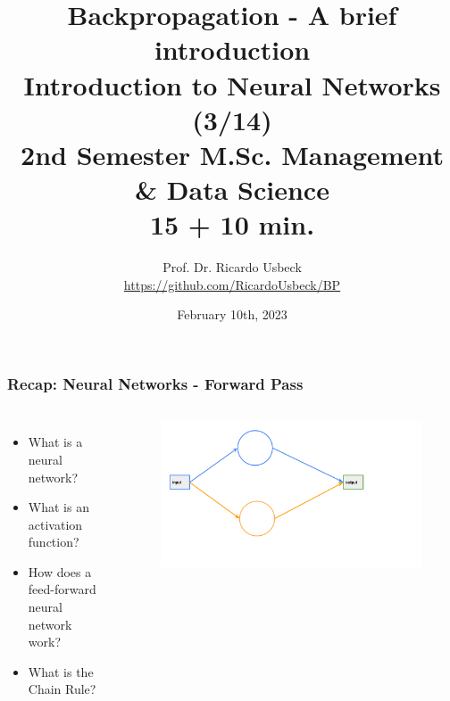 \documentclass[aspectratio=169]{beamer}
\newcommand{\myblue}[1]{{\color{blue}{#1}}}
\begin{document}
\title[Backpropagation]{Backpropagation - A brief introduction\\ 
\normalsize Introduction to Neural Networks (3/14)\\ 
\tiny 2nd Semester M.Sc. Management \& Data Science  \\ 15 + 10 min.}   
\author[Prof. Dr. R. Usbeck]{Prof. Dr. Ricardo Usbeck\\\url{https://github.com/RicardoUsbeck/BP}} 
\date{February 10th, 2023}

\begin{frame}
\titlepage
\end{frame}

\begin{frame}[fragile]\frametitle{Recap: Neural Networks - Forward Pass}
\myblue{What did we talk about last?}\pause
\begin{columns}
        \begin{itemize}
            \item What is a neural network?
            \item What is an activation function?
            \item How does a feed-forward neural network work?
            \item What is the Chain Rule?
        \end{itemize}
        \begin{figure}
        \centering
        \includegraphics[trim={1cm 3cm 5cm 0.35cm },clip,width=\linewidth]{BP_1}
        \end{figure}
\end{columns}
\end{frame}
\end{document}
